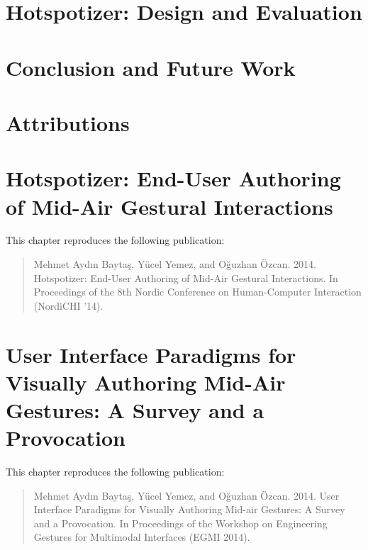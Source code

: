 \documentclass[11pt, twoside]{book}
\begin{document}
\chapter{Hotspotizer: Design and Evaluation}
\label{chp:design}


\chapter{Conclusion and Future Work}
\label{chp:conclusion}


\printbibliography[heading=bibintoc]

\appendix

\chapter{Attributions}


\chapter{Hotspotizer: End-User Authoring of Mid-Air Gestural Interactions}
\label{chp:app-paper-1}
This chapter reproduces the following publication:
\begin{quote}
Mehmet Aydın Baytaş, Yücel Yemez, and Oğuzhan Özcan. 2014. Hotspotizer: End-User Authoring of Mid-Air Gestural Interactions. In Proceedings of the 8th Nordic Conference on Human-Computer Interaction (NordiCHI '14).
\end{quote}


\chapter{User Interface Paradigms for Visually Authoring Mid-Air Gestures: A Survey and a Provocation}
\label{chp:app-paper-2}
This chapter reproduces the following publication:
\begin{quote}
Mehmet Aydın Baytaş, Yücel Yemez, and Oğuzhan Özcan. 2014. User Interface Paradigms for Visually Authoring Mid-air Gestures: A Survey and a Provocation. In Proceedings of the Workshop on Engineering Gestures for Multimodal Interfaces (EGMI 2014).
\end{quote}

\end{document}
